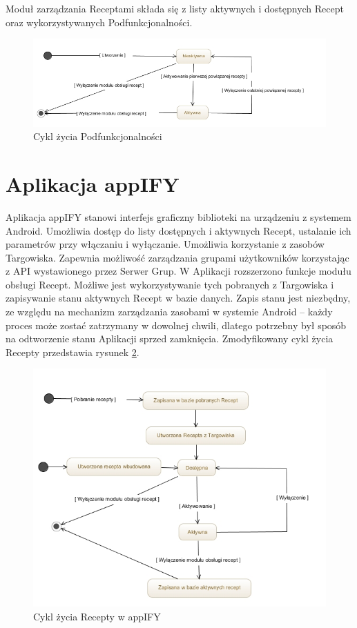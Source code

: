 \documentclass[11pt,a4paper,polish,thesis]{dcsbook}
\begin{document}
Moduł zarządzania Receptami składa się z listy aktywnych i dostępnych Recept oraz wykorzystywanych Podfunkcjonalności.
\begin{figure}[H]
  \centering
  \includegraphics[scale=0.6]{./resources/cykl-zycia-featurea.jpg}
  \caption{Cykl życia Podfunkcjonalności}
  \label{fig:cykl-zycia-featurea}
\end{figure}

\section{Aplikacja appIFY}
Aplikacja appIFY stanowi interfejs graficzny biblioteki na urządzeniu z systemem Android. Umożliwia dostęp do listy dostępnych i aktywnych Recept, ustalanie ich parametrów przy włączaniu i wyłączanie. Umożliwia korzystanie z zasobów Targowiska. Zapewnia możliwość zarządzania grupami użytkowników korzystając z API wystawionego przez Serwer Grup.
W Aplikacji rozszerzono funkcje modułu obsługi Recept. Możliwe jest wykorzystywanie tych pobranych z Targowiska i zapisywanie stanu aktywnych Recept w bazie danych. Zapis stanu jest niezbędny, ze względu na mechanizm zarządzania zasobami w systemie Android -- każdy proces może zostać zatrzymany w dowolnej chwili, dlatego potrzebny był sposób na odtworzenie stanu Aplikacji sprzed zamknięcia. Zmodyfikowany cykl życia Recepty przedstawia rysunek \ref{fig:cykl-zycia-recepty-appify}.
\begin{figure}[H]
  \centering
  \includegraphics[scale=0.7]{./resources/cykl-zycia-recepty-appify.jpg}
  \caption{Cykl życia Recepty w appIFY}
  \label{fig:cykl-zycia-recepty-appify}
\end{figure}
\end{document}
